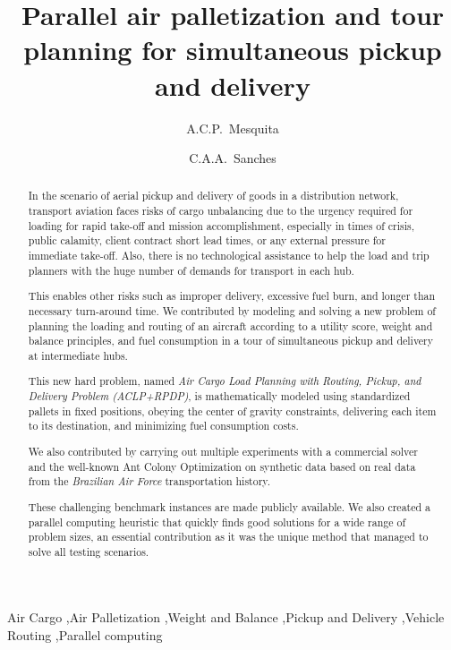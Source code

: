 \documentclass[preprint,authoryear]{elsarticle}
\begin{document}
\begin{frontmatter}

\title{Parallel air palletization and tour planning for simultaneous pickup and delivery}

\author{A.C.P.~Mesquita}

\author{C.A.A.~Sanches}

\address {Instituto Tecnol\'{o}gico de Aeron\'{a}utica - DCTA/ITA/IEC\\
Pra\c{c}a Mal. Eduardo Gomes, 50\\
S\~{a}o Jos\'{e} dos Campos - SP - 12.228-900 - Brazil}


\begin{abstract}

In the scenario of aerial pickup and delivery of goods in a distribution network, transport aviation faces risks of cargo unbalancing due to the urgency required for loading for rapid take-off and mission accomplishment, especially in times of crisis, public calamity, client contract short lead times, or any external pressure for immediate take-off. Also, there is no technological assistance to help the load and trip planners with the huge number of demands for transport in each hub.

This enables other risks such as improper delivery, excessive fuel burn, and longer than necessary turn-around time. We contributed by modeling and solving a new problem of planning the loading and routing of an aircraft according to a utility score, weight and balance principles, and fuel consumption in a tour of simultaneous pickup and delivery at intermediate hubs.

This new hard problem, named {\it Air Cargo Load Planning with Routing, Pickup, and Delivery Problem (ACLP+RPDP)}, is mathematically modeled using standardized pallets in fixed positions, obeying the center of gravity constraints, delivering each item to its destination, and minimizing fuel consumption costs.

We also contributed by carrying out multiple experiments with a commercial solver and the well-known Ant Colony Optimization on synthetic data based on real data from the {\it Brazilian Air Force}\/ transportation history.

These challenging benchmark instances are made publicly available. We also created a parallel computing heuristic that quickly finds good solutions for a wide range of problem sizes, an essential contribution as it was the unique method that managed to solve all testing scenarios.


\end{abstract}

\begin{keyword}
Air Cargo \sep Air Palletization \sep Weight and Balance \sep Pickup and Delivery \sep Vehicle Routing \sep Parallel computing
\end{keyword}

\end{frontmatter}
\end{document}
